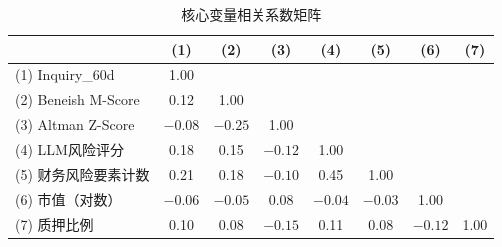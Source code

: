 \begin{table}[H]
\centering
\caption{核心变量相关系数矩阵}
\label{tab:correlation}
\small
\begin{tabular}{lccccccc}
\toprule
 & (1) & (2) & (3) & (4) & (5) & (6) & (7) \\
\midrule
(1) Inquiry\_60d & 1.00 & & & & & & \\
(2) Beneish M-Score & 0.12 & 1.00 & & & & & \\
(3) Altman Z-Score & $-0.08$ & $-0.25$ & 1.00 & & & & \\
(4) LLM风险评分 & 0.18 & 0.15 & $-0.12$ & 1.00 & & & \\
(5) 财务风险要素计数 & 0.21 & 0.18 & $-0.10$ & 0.45 & 1.00 & & \\
(6) 市值（对数） & $-0.06$ & $-0.05$ & 0.08 & $-0.04$ & $-0.03$ & 1.00 & \\
(7) 质押比例 & 0.10 & 0.08 & $-0.15$ & 0.11 & 0.08 & $-0.12$ & 1.00 \\
\bottomrule
\end{tabular}
\end{table}